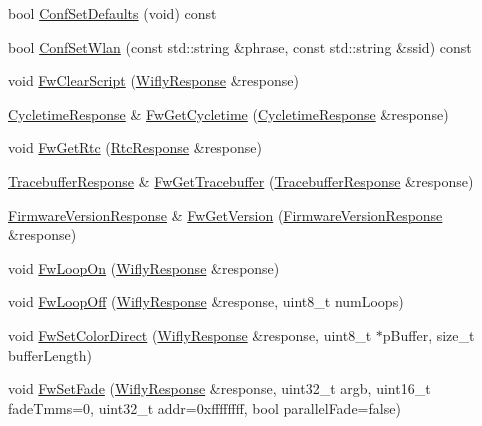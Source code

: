 \begin{DoxyCompactItemize}
\item 
bool \hyperlink{class_wifly_control_a932d65b7b9346a2bd9ced995fe2239ab}{Conf\-Set\-Defaults} (void) const 
\item 
bool \hyperlink{class_wifly_control_ad73ecaee1bf99c406c621fb602abf808}{Conf\-Set\-Wlan} (const std\-::string \&phrase, const std\-::string \&ssid) const 
\item 
void \hyperlink{class_wifly_control_a048e64bf80f176638032fec15f56c793}{Fw\-Clear\-Script} (\hyperlink{class_wifly_response}{Wifly\-Response} \&response)
\item 
\hyperlink{class_cycletime_response}{Cycletime\-Response} \& \hyperlink{class_wifly_control_aa909f4c3c1c02351197fa2bad8005a15}{Fw\-Get\-Cycletime} (\hyperlink{class_cycletime_response}{Cycletime\-Response} \&response)
\item 
void \hyperlink{class_wifly_control_a18b6f0a018f94aae19196fc0c2bc472c}{Fw\-Get\-Rtc} (\hyperlink{class_rtc_response}{Rtc\-Response} \&response)
\item 
\hyperlink{class_tracebuffer_response}{Tracebuffer\-Response} \& \hyperlink{class_wifly_control_ae5d32fb5569a4a4b8b9b5ea0df5ecc1d}{Fw\-Get\-Tracebuffer} (\hyperlink{class_tracebuffer_response}{Tracebuffer\-Response} \&response)
\item 
\hyperlink{class_firmware_version_response}{Firmware\-Version\-Response} \& \hyperlink{class_wifly_control_a8bfdeb73859dc3b95dd823e8b5c18514}{Fw\-Get\-Version} (\hyperlink{class_firmware_version_response}{Firmware\-Version\-Response} \&response)
\item 
void \hyperlink{class_wifly_control_ac0bcc3ca66256effb309545cf7341f9c}{Fw\-Loop\-On} (\hyperlink{class_wifly_response}{Wifly\-Response} \&response)
\item 
void \hyperlink{class_wifly_control_a8bcc4ce879e66a60f25c7790e07d3e61}{Fw\-Loop\-Off} (\hyperlink{class_wifly_response}{Wifly\-Response} \&response, uint8\-\_\-t num\-Loops)
\item 
void \hyperlink{class_wifly_control_a5a1bf514798ab57f893dbadfc525c531}{Fw\-Set\-Color\-Direct} (\hyperlink{class_wifly_response}{Wifly\-Response} \&response, uint8\-\_\-t $\ast$p\-Buffer, size\-\_\-t buffer\-Length)
\item 
void \hyperlink{class_wifly_control_a8f6ce3dc38f480fc68574f87983154ec}{Fw\-Set\-Fade} (\hyperlink{class_wifly_response}{Wifly\-Response} \&response, uint32\-\_\-t argb, uint16\-\_\-t fade\-Tmms=0, uint32\-\_\-t addr=0xffffffff, bool parallel\-Fade=false)
\item 

\end{DoxyCompactItemize}

